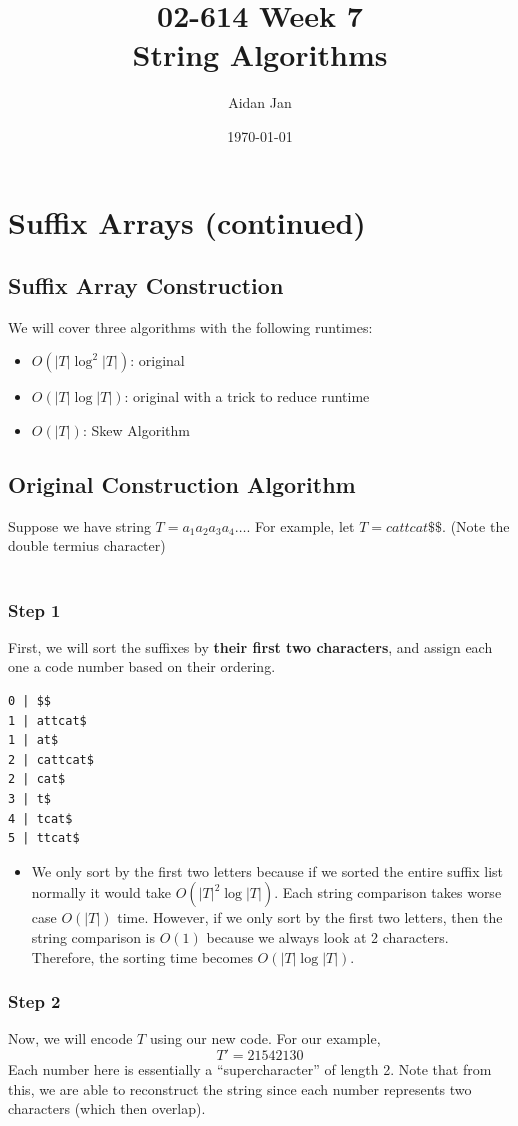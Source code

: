 \documentclass[10pt]{article}
\title{02-614 Week 7 \\ \large{String Algorithms}}
\author{Aidan Jan}
\date{\today}
\begin{document}
\maketitle

\section*{Suffix Arrays (continued)}
\subsection*{Suffix Array Construction}
We will cover three algorithms with the following runtimes:
\begin{itemize}
	\item $O(|T| \log^2 |T|)$: original
	\item $O(|T| \log |T|)$: original with a trick to reduce runtime
	\item $O(|T|)$: Skew Algorithm
\end{itemize}

\subsection*{Original Construction Algorithm}
Suppose we have string $T = a_1 a_2 a_3 a_4 \dots$.  For example, let $T = cattcat\$\$$.  (Note the double termius character)  \\\\
\subsubsection*{Step 1}
First, we will sort the suffixes by \textbf{their first two characters}, and assign each one a code number based on their ordering.
\begin{verbatim}
0 | $$
1 | attcat$
1 | at$
2 | cattcat$
2 | cat$
3 | t$
4 | tcat$
5 | ttcat$
\end{verbatim}
\begin{itemize}
	\item We only sort by the first two letters because if we sorted the entire suffix list normally it would take $O(|T|^2 \log |T|)$.  Each string comparison takes worse case $O(|T|)$ time.  However, if we only sort by the first two letters, then the string comparison is $O(1)$ because we always look at 2 characters.  Therefore, the sorting time becomes $O(|T| \log |T|)$.
\end{itemize}

\subsubsection*{Step 2}
Now, we will encode $T$ using our new code.   For our example,
\[T' = 21542130\]
Each number here is essentially a ``supercharacter'' of length 2.  Note that from this, we are able to reconstruct the string since each number represents two characters (which then overlap).
\end{document}
